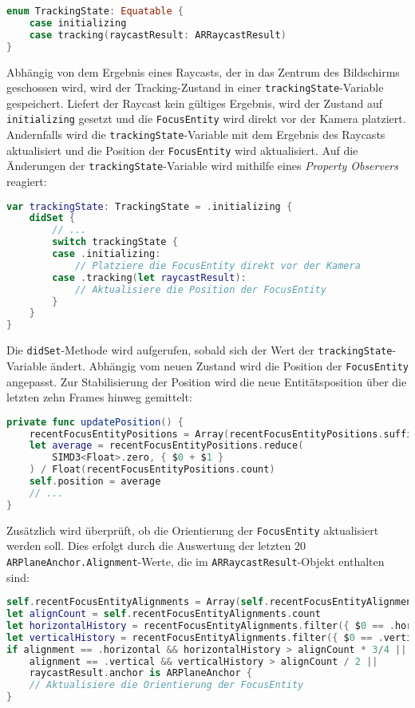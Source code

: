 \begin{lstlisting}[language=Swift]
enum TrackingState: Equatable {
    case initializing
    case tracking(raycastResult: ARRaycastResult)
}
\end{lstlisting}

Abhängig von dem Ergebnis eines Raycasts, der in das Zentrum des Bildschirms geschossen wird, wird der Tracking-Zustand in einer \texttt{trackingState}-Variable gespeichert. Liefert der Raycast kein gültiges Ergebnis, wird der Zustand auf \texttt{initializing} gesetzt und die \texttt{FocusEntity} wird direkt vor der Kamera platziert. Andernfalls wird die \texttt{trackingState}-Variable mit dem Ergebnis des Raycasts aktualisiert und die Position der \texttt{FocusEntity} wird aktualisiert. Auf die Änderungen der \texttt{trackingState}-Variable wird mithilfe eines \textit{Property Observers} reagiert: 

\begin{lstlisting}[language=Swift]
var trackingState: TrackingState = .initializing {
    didSet {
        // ...
        switch trackingState {
        case .initializing:
            // Platziere die FocusEntity direkt vor der Kamera
        case .tracking(let raycastResult):
            // Aktualisiere die Position der FocusEntity
        }
    }
}
\end{lstlisting}

Die \texttt{didSet}-Methode wird aufgerufen, sobald sich der Wert der \texttt{trackingState}-Variable ändert. Abhängig vom neuen Zustand wird die Position der \texttt{FocusEntity} angepasst. Zur Stabilisierung der Position wird die neue Entitätsposition über die letzten zehn Frames hinweg gemittelt:

\begin{lstlisting}[language=Swift]
private func updatePosition() {
    recentFocusEntityPositions = Array(recentFocusEntityPositions.suffix(10))
    let average = recentFocusEntityPositions.reduce(
        SIMD3<Float>.zero, { $0 + $1 }
    ) / Float(recentFocusEntityPositions.count)
    self.position = average
    // ...
}
\end{lstlisting}

Zusätzlich wird überprüft, ob die Orientierung der \texttt{FocusEntity} aktualisiert werden soll. Dies erfolgt durch die Auswertung der letzten 20 \texttt{ARPlaneAnchor.Alignment}-Werte, die im \texttt{ARRaycastResult}-Objekt enthalten sind:

\begin{lstlisting}[language=Swift]
self.recentFocusEntityAlignments = Array(self.recentFocusEntityAlignments.suffix(20))
let alignCount = self.recentFocusEntityAlignments.count
let horizontalHistory = recentFocusEntityAlignments.filter({ $0 == .horizontal }).count
let verticalHistory = recentFocusEntityAlignments.filter({ $0 == .vertical }).count
if alignment == .horizontal && horizontalHistory > alignCount * 3/4 ||
    alignment == .vertical && verticalHistory > alignCount / 2 ||
    raycastResult.anchor is ARPlaneAnchor {
    // Aktualisiere die Orientierung der FocusEntity
}
\end{lstlisting}

